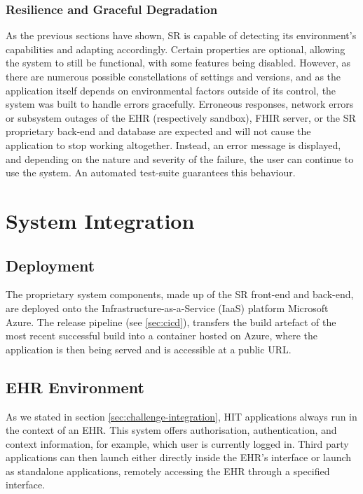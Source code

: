 \documentclass[sigconf]{acmart}
\begin{document}
\subsubsection{Resilience and Graceful Degradation}
\label{sec:graceful-deg}

As the previous sections have shown, SR is capable of detecting its  environment's capabilities and adapting accordingly. Certain  properties are optional, allowing the system to still be functional,  with some features being disabled.%
However, as there are numerous possible constellations of settings and versions, and as the application itself depends on environmental factors outside of its control, the system was built to handle errors gracefully. Erroneous responses, network errors or subsystem outages of the EHR (respectively sandbox), FHIR server, or the SR proprietary back-end and database are expected and will not cause the application to stop working altogether. Instead, an error message is displayed, and depending on the nature and severity of the failure, the user can continue to use the system. An automated test-suite guarantees this behaviour.


\section{System Integration}
\label{sec:system-integration}


\subsection{Deployment}

The proprietary system components, made up of the SR front-end and back-end, are deployed onto the Infrastructure-as-a-Service (IaaS) platform Microsoft Azure. The release pipeline (see \ref{sec:cicd}), transfers the build artefact of the most recent successful build into a container hosted on Azure, where the application is then being served and is accessible at a public URL.


\subsection{EHR Environment}
\label{sec:ehr}

As we stated in section \ref{sec:challenge-integration}, HIT applications always run in the context of an EHR. This system offers authorisation, authentication, and context information, for example, which user is currently logged in. Third party applications can then launch either directly inside the EHR's interface %
or launch as standalone applications, remotely accessing the EHR through a specified interface.%
\end{document}
